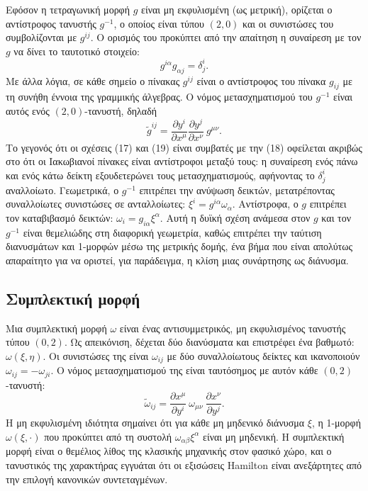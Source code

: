 \documentclass[12pt]{article}
\begin{document}
Εφόσον η τετραγωνική μορφή \( g \) είναι μη εκφυλισμένη (ως μετρική), ορίζεται ο αντίστροφος τανυστής \( g^{-1} \), ο οποίος είναι τύπου \( (2,0) \) και οι συνιστώσες του συμβολίζονται με \( g^{ij} \). Ο ορισμός του προκύπτει από την απαίτηση η συναίρεση με τον \( g \) να δίνει το ταυτοτικό στοιχείο:
\[
g^{i\alpha} g_{\alpha j} = \delta^i_j. \tag{18}
\]
Με άλλα λόγια, σε κάθε σημείο ο πίνακας \( g^{ij} \) είναι ο αντίστροφος του πίνακα \( g_{ij} \) με τη συνήθη έννοια της γραμμικής άλγεβρας. Ο νόμος μετασχηματισμού του \( g^{-1} \) είναι αυτός ενός \( (2,0) \)-τανυστή, δηλαδή
\[
\tilde{g}^{ij} = \frac{\partial y^i}{\partial x^\mu} \frac{\partial y^j}{\partial x^\nu} \ g^{\mu\nu}. \tag{19}
\]
Το γεγονός ότι οι σχέσεις (17) και (19) είναι συμβατές με την (18) οφείλεται ακριβώς στο ότι οι Ιακωβιανοί πίνακες είναι αντίστροφοι μεταξύ τους: η συναίρεση ενός πάνω και ενός κάτω δείκτη εξουδετερώνει τους μετασχηματισμούς, αφήνοντας το \( \delta^i_j \) αναλλοίωτο. Γεωμετρικά, ο \( g^{-1} \) επιτρέπει την ανύψωση δεικτών, μετατρέποντας συναλλοίωτες συνιστώσες σε ανταλλοίωτες: \( \xi^i = g^{i\alpha} \omega_\alpha \). Αντίστροφα, ο \( g \) επιτρέπει τον καταβιβασμό δεικτών: \( \omega_i = g_{i\alpha} \xi^\alpha \). Αυτή η δυϊκή σχέση ανάμεσα στον \( g \) και τον \( g^{-1} \) είναι θεμελιώδης στη διαφορική γεωμετρία, καθώς επιτρέπει την ταύτιση διανυσμάτων και 1-μορφών μέσω της μετρικής δομής, ένα βήμα που είναι απολύτως απαραίτητο για να οριστεί, για παράδειγμα, η κλίση μιας συνάρτησης ως διάνυσμα.

\subsection{Συμπλεκτική μορφή}
Μια συμπλεκτική μορφή \( \omega \) είναι ένας αντισυμμετρικός, μη εκφυλισμένος τανυστής τύπου \( (0,2) \). Ως απεικόνιση, δέχεται δύο διανύσματα και επιστρέφει ένα βαθμωτό: \( \omega(\xi, \eta) \). Οι συνιστώσες της είναι \( \omega_{ij} \) με δύο συναλλοίωτους δείκτες και ικανοποιούν \( \omega_{ij} = -\omega_{ji} \). Ο νόμος μετασχηματισμού της είναι ταυτόσημος με αυτόν κάθε \( (0,2) \)-τανυστή:
\[
\tilde{\omega}_{ij} = \frac{\partial x^\mu}{\partial y^i} \ \omega_{\mu\nu} \ \frac{\partial x^\nu}{\partial y^j}. \tag{20}
\]
Η μη εκφυλισμένη ιδιότητα σημαίνει ότι για κάθε μη μηδενικό διάνυσμα \( \xi \), η 1-μορφή \( \omega(\xi, \cdot) \) που προκύπτει από τη συστολή \( \omega_{\alpha\beta} \xi^\alpha \) είναι μη μηδενική. Η συμπλεκτική μορφή είναι ο θεμέλιος λίθος της κλασικής μηχανικής στον φασικό χώρο, και ο τανυστικός της χαρακτήρας εγγυάται ότι οι εξισώσεις Hamilton είναι ανεξάρτητες από την επιλογή κανονικών συντεταγμένων.
\end{document}
